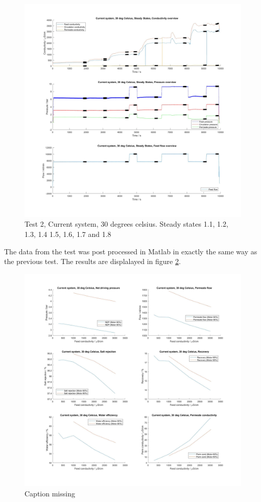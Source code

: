 \begin{figure}[H]
    \centering
    \includegraphics[width=1.1\textwidth]{overview30}
    \caption{Test 2, Current system, 30 degrees celsius. Steady states 1.1, 1.2, 1.3, 1.4 1.5, 1.6, 1.7 and 1.8}
    \label{fig:overw30}
\end{figure}

\newpage


The data from the test was post processed in Matlab in exactly the same way as the previous test. The results are displalayed in figure \ref{fig:K30}. 

\begin{figure}[H]
    \centering
    \includegraphics[width=1.1\textwidth]{Key30}
    \caption{Caption missing}
    \label{fig:K30}
\end{figure}

